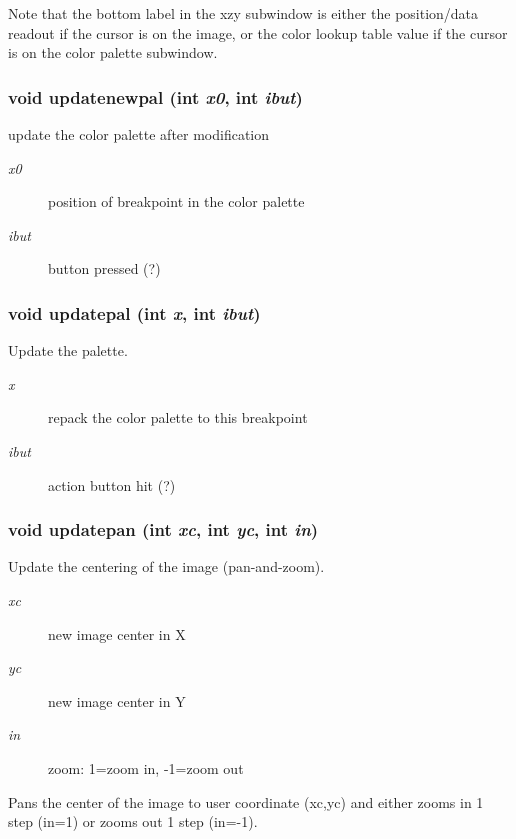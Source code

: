 Note that the bottom label in the xzy subwindow is either the position/data readout if the cursor is on the image, or the color lookup table value if the cursor is on the color palette subwindow. 
\subsubsection{\setlength{\rightskip}{0pt plus 5cm}void updatenewpal (int {\em x0}, int {\em ibut})}\label{xtv_8h_a96}


update the color palette after modification 

\begin{Desc}
\item[Parameters:]
\begin{description}
\item[{\em x0}]position of breakpoint in the color palette \item[{\em ibut}]button pressed (?) \end{description}
\end{Desc}
\subsubsection{\setlength{\rightskip}{0pt plus 5cm}void updatepal (int {\em x}, int {\em ibut})}\label{xtv_8h_a97}


Update the palette. 

\begin{Desc}
\item[Parameters:]
\begin{description}
\item[{\em x}]repack the color palette to this breakpoint \item[{\em ibut}]action button hit (?) \end{description}
\end{Desc}
\subsubsection{\setlength{\rightskip}{0pt plus 5cm}void updatepan (int {\em xc}, int {\em yc}, int {\em in})}\label{xtv_8h_a85}


Update the centering of the image (pan-and-zoom). 

\begin{Desc}
\item[Parameters:]
\begin{description}
\item[{\em xc}]new image center in X \item[{\em yc}]new image center in Y \item[{\em in}]zoom: 1=zoom in, -1=zoom out\end{description}
\end{Desc}
Pans the center of the image to user coordinate (xc,yc) and either zooms in 1 step (in=1) or zooms out 1 step (in=-1). 
